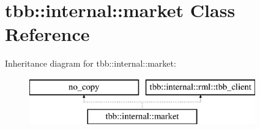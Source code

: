 \hypertarget{classtbb_1_1internal_1_1market}{}\section{tbb\+:\+:internal\+:\+:market Class Reference}
\label{classtbb_1_1internal_1_1market}
Inheritance diagram for tbb\+:\+:internal\+:\+:market\+:\begin{figure}[H]
\begin{center}
\leavevmode
\includegraphics[height=2.000000cm]{classtbb_1_1internal_1_1market}
\end{center}
\end{figure}
